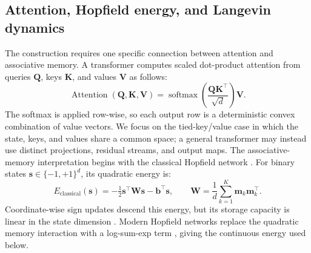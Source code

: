 
\subsection{Attention, Hopfield energy, and Langevin dynamics}

The construction requires one specific connection between attention and
associative memory. A transformer computes scaled dot-product attention from
queries $\mathbf Q$, keys $\mathbf K$, and values $\mathbf V$ as follows:
\begin{equation}
\operatorname{Attention}(\mathbf Q,\mathbf K,\mathbf V)
=\operatorname{softmax}\!\left(
\frac{\mathbf Q\mathbf K^\top}{\sqrt d}\right)\mathbf V.
\label{eq:sdp-attention}
\end{equation}
The softmax is applied row-wise, so each output row is a deterministic convex
combination of value vectors. We focus on the tied-key/value case in which the
state, keys, and values share a common space; a general transformer may instead
use distinct projections, residual streams, and output maps. The
associative-memory interpretation begins with the classical Hopfield network
\cite{hopfieldNeuralNetworksPhysical1982}. For binary states
$\mathbf s\in\{-1,+1\}^d$, its quadratic energy is:
\begin{equation}
E_{\mathrm{classical}}(\mathbf s)
=-\tfrac12\mathbf s^\top\mathbf W\mathbf s-\mathbf b^\top\mathbf s,
\qquad
\mathbf W=\frac1d\sum_{k=1}^K\mathbf m_k\mathbf m_k^\top.
\label{eq:classical-hopfield}
\end{equation}
Coordinate-wise sign updates descend this energy, but its storage capacity is
linear in the state dimension \cite{amitStoringInfiniteNumbers1985}. Modern
Hopfield networks replace the quadratic memory interaction with a log-sum-exp
term \cite{ramsauerHopfieldNetworksAll2021}, giving the continuous energy used
below.

